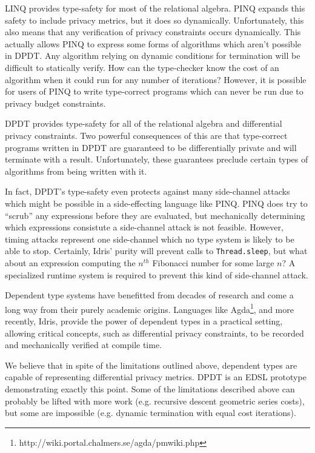 \documentclass[12pt]{report}
\begin{document}
LINQ provides type-safety for most of the relational algebra.
PINQ expands this safety to include privacy metrics, but it does so dynamically.
Unfortunately, this also means that any verification of privacy constraints occurs dynamically.
This actually allows PINQ to express some forms of algorithms which aren't possible in DPDT.
Any algorithm relying on dynamic conditions for termination will be difficult to statically verify.
How can the type-checker know the cost of an algorithm when it could run for any number of iterations?
However, it is possible for users of PINQ to write type-correct programs which can never be run due to privacy budget constraints.

DPDT provides type-safety for all of the relational algebra and differential privacy constraints.
Two powerful consequences of this are that type-correct programs written in DPDT are guaranteed to be differentially private and will terminate with a result.
Unfortunately, these guarantees preclude certain types of algorithms from being written with it.

In fact, DPDT's type-safety even protects against many side-channel attacks which might be possible in a side-effecting language like PINQ.
PINQ does try to ``scrub'' any expressions before they are evaluated, but mechanically determining which expressions consistute a side-channel attack is not feasible.
However, timing attacks represent one side-channel which no type system is likely to be able to stop.
Certainly, Idris' purity will prevent calls to \texttt{Thread.sleep}, but what about an expression computing the $n^{th}$ Fibonacci number for some large $n$?
A specialized runtime system is required to prevent this kind of side-channel attack\cite{conf/uss/HaeberlenPN11}.

Dependent type systems have benefitted from decades of research and come a long way from their purely academic origins.
Languages like Agda\footnote{http://wiki.portal.chalmers.se/agda/pmwiki.php}, and more recently, Idris, provide the power of dependent types in a practical setting, allowing critical concepts, such as differential privacy constraints, to be recorded and mechanically verified at compile time.

We believe that in spite of the limitations outlined above, dependent types are capable of representing differential privacy metrics.
DPDT is an EDSL prototype demonstrating exactly this point.
Some of the limitations described above can probably be lifted with more work (e.g. recursive descent geometric series costs), but some are impossible (e.g. dynamic termination with equal cost iterations).
\end{document}

